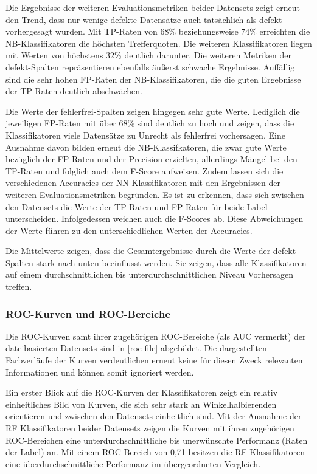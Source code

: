 Die Ergebnisse der weiteren Evaluationsmetriken beider Datensets zeigt erneut den Trend, dass nur wenige defekte Datensätze auch tatsächlich als defekt vorhergesagt wurden. Mit TP-Raten von 68\% beziehungsweise 74\% erreichten die NB-Klassifikatoren die höchsten Trefferquoten. Die weiteren Klassifikatoren liegen mit Werten von höchstens 32\%  deutlich darunter. Die weiteren Metriken der \glqq defekt\grqq -Spalten repräsentieren ebenfalls äußerst schwache Ergebnisse. Auffällig sind die sehr hohen FP-Raten der NB-Klassifikatoren, die die guten Ergebnisse der TP-Raten deutlich abschwächen.

Die Werte der \glqq fehlerfrei\grqq -Spalten zeigen hingegen sehr gute Werte. Lediglich die jeweiligen FP-Raten mit über 68\% sind deutlich zu hoch und zeigen, dass die Klassifikatoren viele Datensätze zu Unrecht als \glqq fehlerfrei\grqq{} vorhersagen. Eine Ausnahme davon bilden erneut die NB-Klassifkatoren, die zwar gute Werte bezüglich der FP-Raten und der Precision erzielten, allerdings Mängel bei den TP-Raten und folglich auch dem F-Score aufweisen. Zudem lassen sich die verschiedenen Accuracies der NN-Klassifikatoren mit den Ergebnissen der weiteren Evaluationsmetriken begründen. Es ist zu erkennen, dass sich zwischen den Datensets die Werte der TP-Raten und FP-Raten für beide Label unterscheiden. Infolgedessen weichen auch die F-Scores ab. Diese Abweichungen der Werte führen zu den unterschiedlichen Werten der Accuracies.

Die Mittelwerte zeigen, dass die Gesamtergebnisse durch die Werte der \glqq defekt\grqq{} -Spalten stark nach unten beeinflusst werden. Sie zeigen, dass alle Klassifikatoren auf einem durchschnittlichen bis unterdurchschnittlichen Niveau Vorhersagen treffen.

\subsubsection*{ROC-Kurven und ROC-Bereiche}

Die ROC-Kurven samt ihrer zugehörigen ROC-Bereiche (als \glqq AUC\grqq{} vermerkt) der dateibasierten Datensets sind in \autoref{roc-file} abgebildet. Die dargestellten Farbverläufe der Kurven verdeutlichen erneut keine für diesen Zweck relevanten Informationen und können somit ignoriert werden.

Ein erster Blick auf die ROC-Kurven der Klassifikatoren zeigt ein relativ einheitliches Bild von Kurven, die sich sehr stark an Winkelhalbierenden orientieren und zwischen den Datensets einheitlich sind. Mit der Ausnahme der RF Klassifikatoren beider Datensets zeigen die Kurven mit ihren zugehörigen ROC-Bereichen eine unterdurchschnittliche bis unerwünschte Performanz (\glqq Raten\grqq{} der Label) an. Mit einem ROC-Bereich von 0,71 besitzen die RF-Klassifikatoren eine überdurchschnittliche Performanz im übergeordneten Vergleich.

